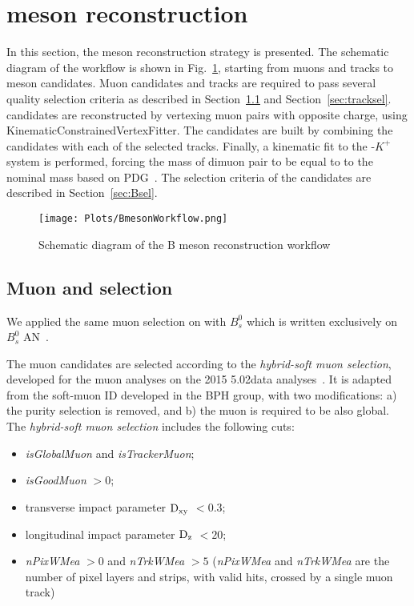 \section{\Bplus meson reconstruction}

In this section, the \Bplus meson reconstruction strategy is presented. 
The schematic diagram of the workflow is shown in Fig.~\ref{fig:workflow}, starting from muons and tracks to \Bplus meson candidates. 
Muon candidates and tracks are required to pass several quality selection criteria as described in Section~\ref{sec:muonsel} and Section~\ref{sec:tracksel}. 
\Jpsi candidates are reconstructed by vertexing muon pairs with opposite charge, using {\footnotesize KinematicConstrainedVertexFitter}.
The \Bplus candidates are built by combining the \Jpsi candidates with each of the selected tracks.
Finally, a kinematic fit to the \Jpsi-$K^+$ system is performed, forcing the mass of dimuon pair to be equal to to the nominal \Jpsi mass based on PDG~\cite{PDG:2018}.
The selection criteria of the \Bplus candidates are described in Section~\ref{sec:Bsel}. \\

\begin{figure}[h]
\centering
\texttt{[image: Plots/BmesonWorkflow.png]}
\caption{Schematic diagram of the B meson reconstruction workflow}
\label{fig:workflow}
\end{figure}


\subsection{Muon and \Jpsi selection}
\label{sec:muonsel}

We applied the same muon selection on \Bplus with $B^0_{s}$ which is written exclusively on $B^0_{s}$ AN~\cite{AN-19-055}.

\iffalse
The muon candidates are selected according to the {\it{hybrid-soft muon selection}}, developed for the muon analyses on the 2015 5.02\TeV data analyses~\cite{AN-16-048}. It is adapted from the soft-muon ID developed in the BPH group, with two modifications: a) the purity selection is removed, and b) the muon is required to be also global. 
The {\it{hybrid-soft muon selection}} includes the following cuts:
\begin{itemize}
\item \textit{isGlobalMuon} and \textit{isTrackerMuon};
\item \textit{isGoodMuon} $> 0$;
\item transverse impact parameter \textit{$\rm D_{xy}$} $< 0.3$;
\item longitudinal impact parameter \textit{$\rm D_{z}$} $< 20$;
\item \textit{nPixWMea} $> 0$ and \textit{nTrkWMea} $> 5$ (\textit{nPixWMea} and \textit{nTrkWMea} are  the number of pixel layers and strips, with valid hits, crossed by a single muon track)
\end{itemize}

